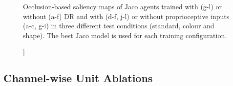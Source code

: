 \begin{figure}[h!]
\begin{subfigure}{0.24\columnwidth}
  \end{subfigure}
  \caption[[Occlusion-based saliency maps of Jaco agents.]]{Occlusion-based saliency maps of Jaco agents trained with (g-l) or without (a-f) DR and with (d-f, j-l) or without proprioceptive inputs (a-c, g-i) in three different test conditions (standard, colour and shape). The best Jaco model is used for each training configuration.}
  \label{fig:saliency_jaco_distractor}
\end{figure}

\subsection{Channel-wise Unit Ablations}

